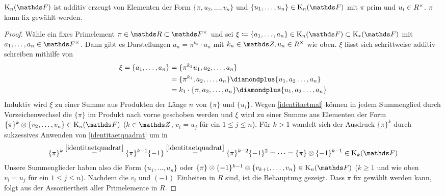 \documentclass[ngerman,fontsize=11pt, paper=a4, parskip=half, titlepage=true, toc=bib]{scrartcl}
\begin{document}
\begin{Lem}\label{darstellungknf}
  $\KnF$ ist additiv erzeugt von Elementen der Form 
  $\{\pi, u_{2},\dotsc,v_n\}$
  und $\{u_{1},\dotsc,u_n\}\in\KnF$ mit $\pi$ prim und
  $u_i\in R^\times$.
  $\pi$ kann fix gewählt werden.
\begin{proof}
  Wähle ein fixes Primelement $\pi\in\R\subset\Fx$
  und sei $\xi\coloneqq\{a_1,\dotsc, a_n\}\in\KnF\subset\KF$ mit
  $a_1,\dotsc,a_n\in\Fx$. Dann gibt es Darstellungen
  $a_n=\pi^{k_n}\cdot u_n$ mit $k_n\in\Z,u_n\in \Rx$ wie
  oben. $\xi$ lässt sich schrittweise additiv schreiben mithilfe
  von
  \begin{align*}
    \xi=\{a_1,\dotsc,a_n\}
    &=\{\pi^{k_1}u_1, a_2, \dotsc, a_n\}\\
    &=\{\pi^{k_1}, a_2, \dotsc, a_n\}
      \p\{u_1, a_2 \dotsc, a_n\}\\
    &=k_1\cdot \{\pi,a_2, \dotsc, a_n\}
      \p\{u_1, a_2 \dotsc, a_n\}
  \end{align*}
  Induktiv wird $\xi$ zu einer Summe aus Produkten der Länge $n$ von
  $\{\pi\}$ und $\{u_i\}$.
  Wegen \ref{identitaetmal} können in jedem Summenglied durch
  Vorzeichenwechsel die $\{\pi\}$ im Produkt nach vorne geschoben werden
  und $\xi$ wird zu einer Summe aus Elementen der Form
  $\{\pi\}^k\otimes\{v_{2},\dotsc,v_n\}\in\KnF$ 
  ($k\in\Z$, $v_i=u_j$ für ein $1\leq j\leq n$).
  Für $k>1$ wandelt sich der Ausdruck $\{\pi\}^k$ durch
  sukzessives Anwenden von \ref{identitaetquadrat} um in
  \begin{gather*}
    \{\pi\}^k
    \overset{\ref{identitaetquadrat}}{=} \{\pi\}^{k-1}\{-1\}
    \overset{\ref{identitaetquadrat}}{=} \{\pi\}^{k-2}\{-1\}^2
    =\dotsb=\{\pi\}\otimes\{-1\}^{k-1} \in\K_{k}(\F)
  \end{gather*}
  Unsere Summenglieder haben also die Form $\{u_1,\dotsc, u_n\}$ oder
  $\{\pi\}\otimes\{-1\}^{k-1}\otimes\{v_{k+1},\dotsc,v_n\}\in\KnF$
  ($k\geq 1$ und wie oben $v_i=u_j$ für ein $1\leq j\leq n$).
  Nachdem die $v_i$ und $(-1)$ Einheiten in $R$ sind,
  ist die Behauptung gezeigt.
  Dass $\pi$ fix gewählt werden kann, folgt aus der Assoziiertheit
  aller Primelemente in $R$.
\end{proof}
\end{Lem}

\end{document}
